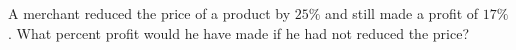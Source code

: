A merchant reduced the price of a product by $25\%$ and still made a profit of $17\%$. What percent profit would he have made if he had not reduced the price?
